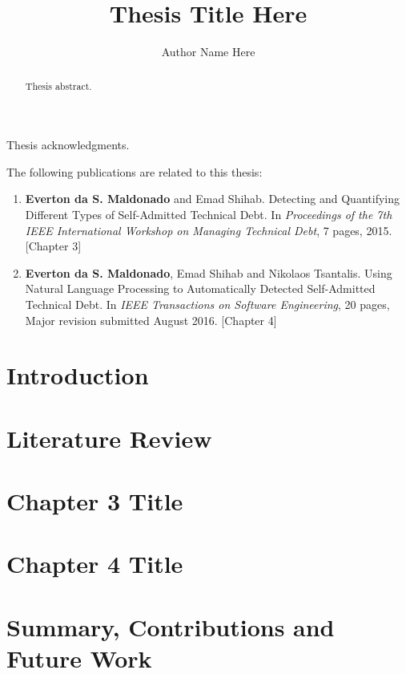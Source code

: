 \documentclass[12pt]{report}
\author{Author Name Here}
\title {Thesis Title Here}
\begin{document}
\begin{abstract}

Thesis abstract.

\end{abstract}

\begin{acknowledgments}

Thesis acknowledgments.

\end{acknowledgments}

\begin{publications}

The following publications are related to this thesis:

\begin{enumerate}

\item \textbf{Everton da S. Maldonado} and Emad Shihab. Detecting and Quantifying Different Types of Self-Admitted Technical Debt. In \textit{Proceedings of the 7th IEEE International Workshop on Managing Technical Debt}, 7 pages, 2015. [Chapter 3]

\item \textbf{Everton da S. Maldonado}, Emad Shihab and Nikolaos Tsantalis. Using Natural Language Processing to Automatically Detected Self-Admitted Technical Debt. In \textit{IEEE Transactions on Software Engineering}, 20 pages, Major revision submitted August 2016. [Chapter 4] 

\end{enumerate}

\end{publications}

\chapter{Introduction}
\label{introduction}


\chapter{Literature Review}
\label{literature_review}


\chapter{Chapter 3 Title}
\label{chapter3}


\chapter{Chapter 4 Title}
\label{chapter4}


\chapter{Summary, Contributions and Future Work}
\label{conclusion}


  

\end{document}
